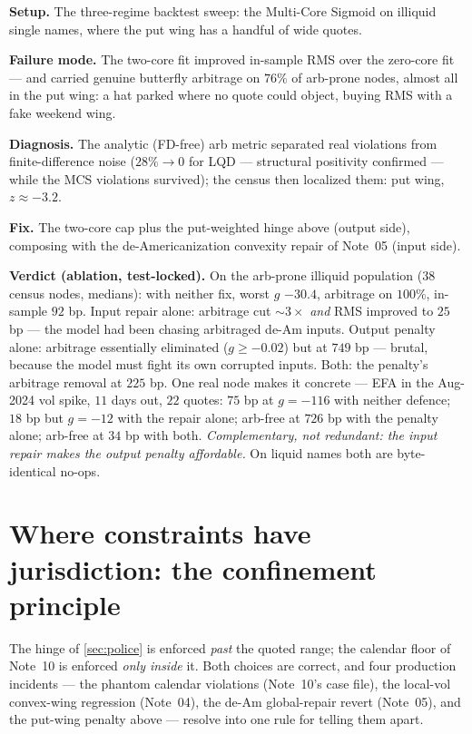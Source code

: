 \documentclass[11pt]{article}
\begin{document}
\begin{example}[title={Case file: the MCS that invented a put wing}]
\textbf{Setup.}  The three-regime backtest sweep: the Multi-Core
Sigmoid on illiquid single names, where the put wing has a handful of
wide quotes.

\textbf{Failure mode.}  The two-core fit improved in-sample RMS over
the zero-core fit --- and carried genuine butterfly arbitrage on $76\%$
of arb-prone nodes, almost all in the put wing: a hat parked where no
quote could object, buying RMS with a fake weekend wing.

\textbf{Diagnosis.}  The analytic (FD-free) arb metric separated real
violations from finite-difference noise ($28\%\to0$ for LQD ---
structural positivity confirmed --- while the MCS violations survived);
the census then localized them: put wing, $z\approx-3.2$.

\textbf{Fix.}  The two-core cap plus the put-weighted hinge above
(output side), composing with the de-Americanization convexity repair of
Note~05 (input side).

\textbf{Verdict (ablation, test-locked).}  On the arb-prone illiquid
population ($38$ census nodes, medians): with neither fix, worst $g$
$-30.4$, arbitrage on $100\%$, in-sample $92$ bp.  Input repair alone:
arbitrage cut ${\sim}3\times$ \emph{and} RMS improved to $25$ bp --- the
model had been chasing arbitraged de-Am inputs.  Output penalty alone:
arbitrage essentially eliminated ($g\ge-0.02$) but at $749$ bp ---
brutal, because the model must fight its own corrupted inputs.  Both:
the penalty's arbitrage removal at $225$ bp.  One real node makes it
concrete --- EFA in the Aug-2024 vol spike, $11$ days out, $22$ quotes:
$75$ bp at $g=-116$ with neither defence; $18$ bp but $g=-12$ with the
repair alone; arb-free at $726$ bp with the penalty alone; arb-free at
$34$ bp with both.  \emph{Complementary, not redundant: the input
repair makes the output penalty affordable.}  On liquid names both are
byte-identical no-ops.
\end{example}

\section{Where constraints have jurisdiction: the confinement principle}
\label{sec:confine}

The hinge of \cref{sec:police} is enforced \emph{past} the quoted range;
the calendar floor of Note~10 is enforced \emph{only inside} it.  Both
choices are correct, and four production incidents --- the phantom
calendar violations (Note~10's case file), the local-vol convex-wing
regression (Note~04), the de-Am global-repair revert (Note~05), and the
put-wing penalty above --- resolve into one rule for telling them apart.
\end{document}
